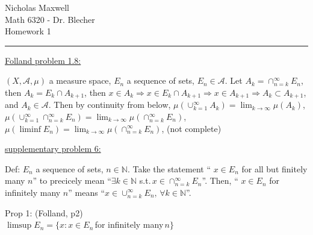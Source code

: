 \documentclass[12pt]{article}
\begin{document}
\begin{flushleft}
Nicholas Maxwell\\
Math 6320 - Dr. Blecher\\
Homework 1
\end{flushleft}

\begin{flushleft}
\addvspace{5pt} \hrule
\end{flushleft}

\begin{flushleft}
\underline{Folland problem 1.8:}
\end{flushleft}



\begin{flushleft}
$(X,\mathcal{A},\mu)$ a measure space, $E_n$ a sequence of sets, $E_n \in \mathcal{A}$. Let $A_k = \cap_{n=k}^{\infty} E_n$, then $A_k = E_k \cap A_{k+1}$, then $x \in A_k \Rightarrow x \in E_k \cap A_{k+1} \Rightarrow x \in A_{k+1} \Rightarrow A_k \subset A_{k+1}$, and $A_k \in \mathcal{A}$. Then by continuity from below, $\mu \left( \cup_{k=1}^\infty A_k \right) = \lim_{k \rightarrow \infty} \mu (A_k)$, $\mu \left( \cup_{k=1}^\infty \cap_{n=k}^{\infty} E_n \right) = \lim_{k \rightarrow \infty} \mu (\cap_{n=k}^{\infty} E_n)$, 
$\mu \left( \liminf E_n \right) = \lim_{k \rightarrow \infty} \mu (\cap_{n=k}^{\infty} E_n)$, 
(not complete)
\end{flushleft}




\begin{flushleft}
\underline{supplementary problem 6:}
\end{flushleft}

\begin{flushleft}
Def: $E_n$ a sequence of sets, $n \in \mathbb{N}$. Take the statement `` $x \in E_n$ for all but finitely many $n$'' to precicely mean ``$\exists k \in \mathbb{N}$ s.t.$ \, x \in \cap_{n=k}^{\infty} E_n $''. Then, `` $x \in E_n$ for infinitely many $n$'' means ``$ x \in \cup_{n=k}^{\infty} E_n,\, \forall k \in \mathbb{N}$''.
\end{flushleft}

\begin{flushleft}
Prop 1: (Folland, p2) \\
$\limsup E_n = \{ x : x \in E_n \,$for infinitely many$\, n \}$
\end{flushleft}
\end{document}

